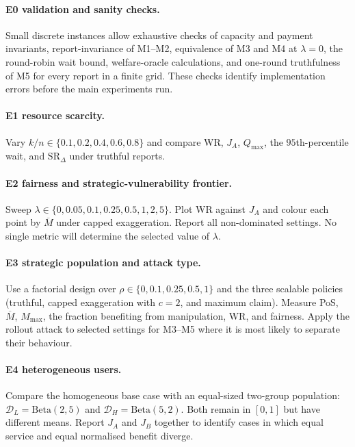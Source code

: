 \documentclass{article}
\begin{document}
\paragraph{E0 validation and sanity checks.}
Small discrete instances allow exhaustive checks of capacity and payment
invariants, report-invariance of M1--M2, equivalence of M3 and M4 at
$\lambda=0$, the round-robin wait bound, welfare-oracle calculations, and
one-round truthfulness of M5 for every report in a finite grid. These checks
identify implementation errors before the main experiments run.

\paragraph{E1 resource scarcity.}
Vary $k/n\in\{0.1,0.2,0.4,0.6,0.8\}$ and compare WR, $J_A$,
$Q_{\max}$, the $95$th-percentile wait, and $\mathrm{SR}_{\Delta}$ under
truthful reports.

\paragraph{E2 fairness and strategic-vulnerability frontier.}
Sweep
$\lambda\in\{0,0.05,0.1,0.25,0.5,1,2,5\}$. Plot WR against $J_A$ and
colour each point by $\overline M$ under capped exaggeration. Report all
non-dominated settings. No single metric will determine the selected value of
$\lambda$.

\paragraph{E3 strategic population and attack type.}
Use a factorial design over
$\rho\in\{0,0.1,0.25,0.5,1\}$ and the three scalable policies (truthful,
capped exaggeration with $c=2$, and maximum claim). Measure PoS,
$\overline M$, $M_{\max}$, the fraction benefiting from manipulation, WR,
  and fairness. Apply the rollout attack to selected settings for M3--M5 where
  it is most likely to separate their behaviour.

\paragraph{E4 heterogeneous users.}
Compare the homogeneous base case with an equal-sized two-group population:
$\mathcal D_L=\mathrm{Beta}(2,5)$ and
  $\mathcal D_H=\mathrm{Beta}(5,2)$. Both remain in $[0,1]$ but have different
  means. Report $J_A$ and $J_B$ together to identify cases in which equal
  service and equal normalised benefit diverge.
\end{document}
